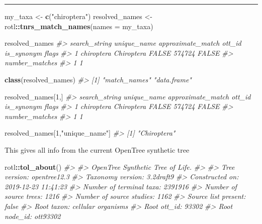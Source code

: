 \documentclass[]{article}
\newenvironment{Shaded}{\begin{snugshade}}{\end{snugshade}}
\newcommand{\CommentTok}[1]{\textcolor[rgb]{0.56,0.35,0.01}{\textit{#1}}}
\newcommand{\DataTypeTok}[1]{\textcolor[rgb]{0.13,0.29,0.53}{#1}}
\newcommand{\DecValTok}[1]{\textcolor[rgb]{0.00,0.00,0.81}{#1}}
\newcommand{\KeywordTok}[1]{\textcolor[rgb]{0.13,0.29,0.53}{\textbf{#1}}}
\newcommand{\NormalTok}[1]{#1}
\newcommand{\OperatorTok}[1]{\textcolor[rgb]{0.81,0.36,0.00}{\textbf{#1}}}
\newcommand{\StringTok}[1]{\textcolor[rgb]{0.31,0.60,0.02}{#1}}
\begin{document}
\begin{center}\rule{0.5\linewidth}{0.5pt}\end{center}

\begin{Shaded}
\begin{Highlighting}[]

\NormalTok{my_taxa <-}\StringTok{ }\KeywordTok{c}\NormalTok{(}\StringTok{"chiroptera"}\NormalTok{)}
\NormalTok{resolved_names <-}\StringTok{ }\NormalTok{rotl}\OperatorTok{::}\KeywordTok{tnrs_match_names}\NormalTok{(}\DataTypeTok{names =}\NormalTok{ my_taxa)}

\NormalTok{resolved_names}
\CommentTok{#>   search_string unique_name approximate_match ott_id is_synonym flags}
\CommentTok{#> 1    chiroptera  Chiroptera             FALSE 574724      FALSE      }
\CommentTok{#>   number_matches}
\CommentTok{#> 1              1}
\end{Highlighting}
\end{Shaded}

\begin{Shaded}
\begin{Highlighting}[]
\KeywordTok{class}\NormalTok{(resolved_names)}
\CommentTok{#> [1] "match_names" "data.frame"}
\end{Highlighting}
\end{Shaded}

\begin{Shaded}
\begin{Highlighting}[]
\NormalTok{resolved_names[}\DecValTok{1}\NormalTok{,]}
\CommentTok{#>   search_string unique_name approximate_match ott_id is_synonym flags}
\CommentTok{#> 1    chiroptera  Chiroptera             FALSE 574724      FALSE      }
\CommentTok{#>   number_matches}
\CommentTok{#> 1              1}
\end{Highlighting}
\end{Shaded}

\begin{Shaded}
\begin{Highlighting}[]
\NormalTok{resolved_names[}\DecValTok{1}\NormalTok{,}\StringTok{"unique_name"}\NormalTok{]}
\CommentTok{#> [1] "Chiroptera"}
\end{Highlighting}
\end{Shaded}

This gives all info from the current OpenTree synthetic tree

\begin{Shaded}
\begin{Highlighting}[]
\NormalTok{rotl}\OperatorTok{::}\KeywordTok{tol_about}\NormalTok{()}
\CommentTok{#> }
\CommentTok{#> OpenTree Synthetic Tree of Life.}
\CommentTok{#> }
\CommentTok{#> Tree version: opentree12.3}
\CommentTok{#> Taxonomy version: 3.2draft9}
\CommentTok{#> Constructed on: 2019-12-23 11:41:23}
\CommentTok{#> Number of terminal taxa: 2391916}
\CommentTok{#> Number of source trees: 1216}
\CommentTok{#> Number of source studies: 1162}
\CommentTok{#> Source list present: false}
\CommentTok{#> Root taxon: cellular organisms}
\CommentTok{#> Root ott_id: 93302}
\CommentTok{#> Root node_id: ott93302}
\end{Highlighting}
\end{Shaded}
\end{document}
